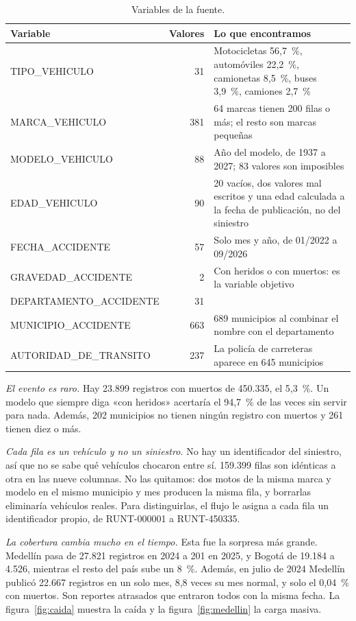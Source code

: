 \documentclass[11pt,a4paper]{article}
\begin{document}
\begin{table}[H]
\centering\small
\caption{Variables de la fuente.}\label{tab:variables}
\begin{tabularx}{\textwidth}{@{}lrX@{}}
\toprule
Variable & Valores & Lo que encontramos \\
\midrule
TIPO\_VEHICULO & 31 & Motocicletas 56,7~\%, automóviles 22,2~\%, camionetas 8,5~\%, buses 3,9~\%, camiones 2,7~\% \\
MARCA\_VEHICULO & 381 & 64 marcas tienen 200 filas o más; el resto son marcas pequeñas \\
MODELO\_VEHICULO & 88 & Año del modelo, de 1937 a 2027; 83 valores son imposibles \\
EDAD\_VEHICULO & 90 & 20 vacíos, dos valores mal escritos y una edad calculada a la fecha de publicación, no del siniestro \\
FECHA\_ACCIDENTE & 57 & Solo mes y año, de 01/2022 a 09/2026 \\
GRAVEDAD\_ACCIDENTE & 2 & Con heridos o con muertos: es la variable objetivo \\
DEPARTAMENTO\_ACCIDENTE & 31 & \\
MUNICIPIO\_ACCIDENTE & 663 & 689 municipios al combinar el nombre con el departamento \\
AUTORIDAD\_DE\_TRANSITO & 237 & La policía de carreteras aparece en 645 municipios \\
\bottomrule
\end{tabularx}
\end{table}

\textit{El evento es raro.} Hay 23.899 registros con muertos de 450.335, el 5,3~\%. Un modelo que siempre diga «con heridos» acertaría el 94,7~\% de las veces sin servir para nada. Además, 202 municipios no tienen ningún registro con muertos y 261 tienen diez o más.

\textit{Cada fila es un vehículo y no un siniestro.} No hay un identificador del siniestro, así que no se sabe qué vehículos chocaron entre sí. 159.399 filas son idénticas a otra en las nueve columnas. No las quitamos: dos motos de la misma marca y modelo en el mismo municipio y mes producen la misma fila, y borrarlas eliminaría vehículos reales. Para distinguirlas, el flujo le asigna a cada fila un identificador propio, de RUNT-000001 a RUNT-450335.

\textit{La cobertura cambia mucho en el tiempo.} Esta fue la sorpresa más grande. Medellín pasa de 27.821 registros en 2024 a 201 en 2025, y Bogotá de 19.184 a 4.526, mientras el resto del país sube un 8~\%. Además, en julio de 2024 Medellín publicó 22.667 registros en un solo mes, 8,8 veces su mes normal, y solo el 0,04~\% con muertos. Son reportes atrasados que entraron todos con la misma fecha. La figura~\ref{fig:caida} muestra la caída y la figura~\ref{fig:medellin} la carga masiva.
\end{document}
